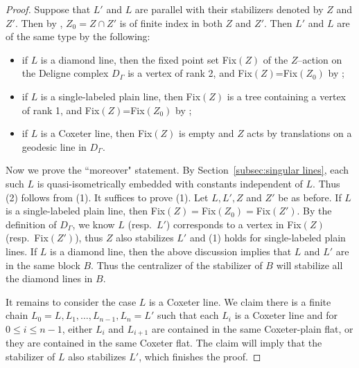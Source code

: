 \documentclass[11pt]{amsart}
\theoremstyle{definition}
\begin{document}
\begin{proof}
Suppose that $L'$ and $L$ are parallel with their stabilizers denoted by $Z$ and $Z'$. Then by \cite[Corollary 2.4]{MR2867450}, $Z_0=Z\cap Z'$ is of finite index in both $Z$ and $Z'$. Then $L'$ and $L$ are of the same type by the following:
\begin{itemize}
	\item if $L$ is a diamond line, then the fixed point set Fix$(Z)$ of the $Z$--action on the Deligne complex $D_\Gamma$ is a vertex of rank 2, and Fix$(Z)$=Fix$(Z_0)$ by \cite[Lemma 8 (ii)]{MR2174269};
	\item if $L$ is a single-labeled plain line, then Fix$(Z)$ is a tree containing a vertex of rank 1, and Fix$(Z)$=Fix$(Z_0)$ by \cite[Lemma 8 (i)]{MR2174269};
	\item if $L$ is a Coxeter line, then Fix$(Z)$ is empty and $Z$ acts by translations on a geodesic line in $D_\Gamma$.
\end{itemize}

Now we prove the ``moreover" statement. By Section~\ref{subsec:singular lines}, each such $L$ is quasi-isometrically embedded with constants independent of $L$. Thus (2) follows from (1). It suffices to prove (1). Let $L,L',Z$ and $Z'$ be as before. If $L$ is a single-labeled plain line, then Fix$(Z)=$Fix$(Z_0)=$Fix$(Z')$. By the definition of $D_\Gamma$, we know $L$ (resp.\ $L'$) corresponds to a vertex in Fix$(Z)$ (resp.\ Fix$(Z')$), thus $Z$ also stabilizes $L'$ and (1) holds for single-labeled plain lines. If $L$ is a diamond line, then the above discussion implies that $L$ and $L'$ are in the same block $B$. Thus the centralizer of the stabilizer of $B$ will stabilize all the diamond lines in $B$.
	
	It remains to consider the case $L$ is a Coxeter line. We claim there is a finite chain $L_0=L,L_1,\ldots,L_{n-1},L_n=L'$ such that each $L_i$ is a Coxeter line and for $0\le i\le n-1$, either $L_i$ and $L_{i+1}$ are contained in the same Coxeter-plain flat, or they are contained in the same Coxeter flat. The claim will imply that the stabilizer of $L$ also stabilizes $L'$, which finishes the proof.
	

\end{proof}
\end{document}
